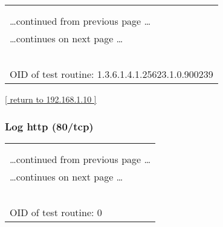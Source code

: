 \documentclass{article}
\begin{document}
\begin{longtable}{|p{}|}
\hline
\rowcolor{openvas_log}{\color{white}{Log (CVSS: 0.0) }}\\
\rowcolor{openvas_log}{\color{white}{NVT: Checks for open tcp ports}}\\
\hline
\endfirsthead
\hfill\ldots continued from previous page \ldots \\
\hline
\endhead
\hline
\ldots continues on next page \ldots \\
\endfoot
\hline
\endlastfoot
\\
\rowcolor{white}{\verb=Open TCP ports: 80, 110, 445, 993, 22, 8080, 995, 139, 53, 143=}\\
\rowcolor{white}{\verb==}\\
\rowcolor{white}{\verb==}\\
\\
OID of test routine: 1.3.6.1.4.1.25623.1.0.900239\\
\end{longtable}

\begin{footnotesize}\hyperref[host:192.168.1.10]{[ return to 192.168.1.10 ]}\end{footnotesize}
\subsubsection{Log http (80/tcp)}
\label{port:192.168.1.10 http (80/tcp) Log}

\begin{longtable}{|p{}|}
\hline
\rowcolor{openvas_log}{\color{white}{Log}}\\
\rowcolor{openvas_log}{\color{white}{NVT: }}\\
\hline
\endfirsthead
\hfill\ldots continued from previous page \ldots \\
\hline
\endhead
\hline
\ldots continues on next page \ldots \\
\endfoot
\hline
\endlastfoot
\\
\rowcolor{white}{\verb=Open port.=}\\
\rowcolor{white}{\verb==}\\
\rowcolor{white}{\verb==}\\
\\
OID of test routine: 0\\
\end{longtable}
\end{document}
